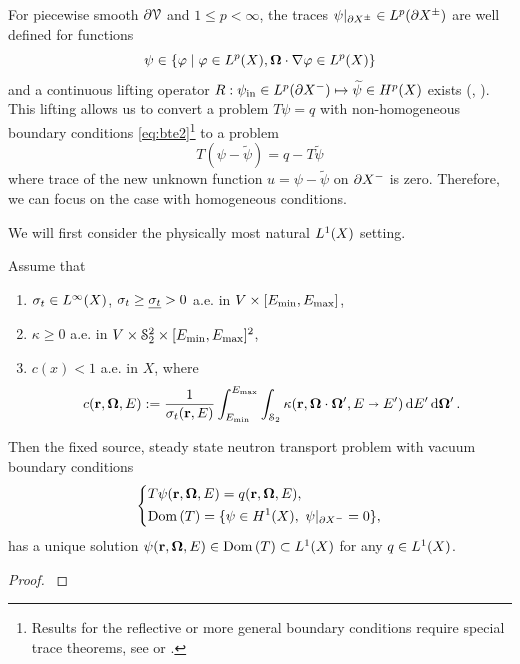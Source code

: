 For piecewise smooth
$\pV$ and $1\leq p < \infty$, the traces $\psi\vert_{\pX[\pm]}\in\Lp(\pX[\pm])$ are well defined for functions  
$$
\psi\in \{\varphi\mid \varphi\in\Lp(X), \bomega\cdot\nabla\varphi\in\Lp(X)\} 
$$
and a continuous lifting operator $R: \psi_{\text{in}}\in\Lp(\pX[-]) \mapsto \widetilde\psi \in \Hp(X)$ exists
(\cite[Chap.
XXI]{DautrayLions}, \cite{Boulanouar1}).
This lifting allows us to convert a problem $T\psi = q$ with non-homogeneous boundary conditions 
\eqref{eq:bte2}\footnote{Results for the reflective or more general boundary conditions require special trace theorems, see 
\cite[Chap. XXI, Appendix of \S2]{DautrayLions} or \cite[Chap. 2]{Agoshkov}.} to a problem 
$$
	T(\psi - \widetilde\psi) = q - T\widetilde\psi
$$ 
where trace of the new unknown function $u = \psi - \widetilde\psi$ on $\pX[-]$ is zero. Therefore, we can focus on the
case with homogeneous conditions. 

We will first consider the physically most natural $\Lp[1](X)$ setting.
\begin{theorem}\label{thm1}
Assume that
\begin{enumerate}[label=(\alph*)]
	\item $\sigma_t \in \Lp[\infty](X)$, $\sigma_t \geq \mst > 0$ a.e. in $V\times[\Emin,\Emax]$,
	\item $\kappa \geq 0$ a.e. in $V\times\Sphere^2\times[\Emin,\Emax]^2$,
	\item $\displaystyle c(x) < 1$ a.e. in $X$, where
	  \begin{equation}\label{eq:c}
	    c(\br,\bomega,E) := \frac{1}{\sigma_t(\br,E)}\int_{\Emin}^{\Emax}\int_{\Sphere} \kappa(\br,\bomega\cdot\bomega',
	    E\shortrightarrow E')\,\d{E'}\d{\bomega'}.
	  \end{equation}
\end{enumerate}
Then the fixed source, steady state neutron transport problem with vacuum boundary conditions 
\begin{equation*}
  \left\{
  \begin{aligned}
     &T\psi(\br,\bomega,E) = q(\br,\bomega,E),\\
     &\Dom{T} = \{\psi\in \Hp[1](X),\ \psi\vert_{\pX[-]} = 0\},
  \end{aligned}
  \right.
\end{equation*}
has a unique solution $\psi(\br,\bomega,E)\in\Dom{T}\subset\Lp[1](X)$ for any $q\in \Lp[1](X)$.
\end{theorem}
\begin{proof}
\cite[Chap. XXI, \S 2, Proposition 5]{DautrayLions}
\end{proof}

